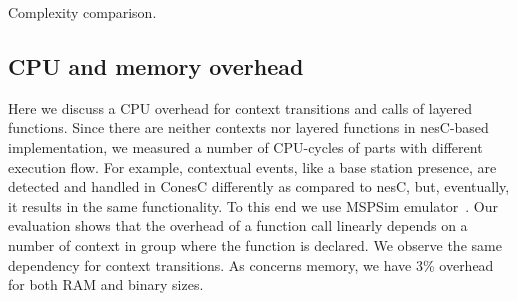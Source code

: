 \begin{table}[!h]
\renewcommand{\arraystretch}{1.3}
\caption{Complexity comparison.}
\label{tab:compres}

\end{table}

\subsection{CPU and memory overhead}

Here we discuss a CPU overhead for context transitions and calls of layered
functions. Since there are neither contexts nor layered functions in nesC-based
implementation, we measured a number of CPU-cycles of parts with different
execution flow. For example, contextual events, like a base station presence,
are detected and handled in ConesC differently as compared to nesC, but,
eventually, it results in the same functionality. To this end we use MSPSim
emulator~\cite{eriksson09}. Our evaluation shows that the overhead of a function
call linearly depends on a number of context in group where the function is
declared. We observe the same dependency for context transitions. As concerns
memory, we have 3\% overhead for both RAM and binary sizes.
